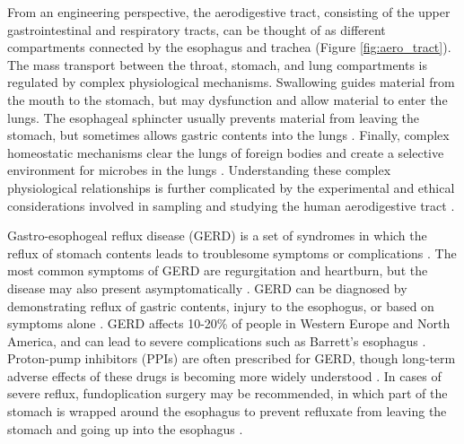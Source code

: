 \documentclass[12pt]{article}
\begin{document}
From an engineering perspective, the aerodigestive tract,
consisting of the upper gastrointestinal and respiratory tracts,
can be thought of as different compartments connected by the esophagus and trachea (Figure \ref{fig:aero_tract}).
The mass transport between the throat, stomach, and lung compartments is regulated by complex physiological 
mechanisms. Swallowing guides material from the mouth to the stomach, 
but may dysfunction and allow material to enter the lungs. The 
esophageal sphincter usually prevents material from leaving the 
stomach, but sometimes allows gastric contents into the lungs \cite{beck-lung-2012}. Finally, complex 
homeostatic mechanisms clear the lungs of foreign bodies and create a 
selective environment for microbes in the lungs \cite{martinharris-mbs-2008, dickson-lung_microbiome-2014}. 
Understanding these complex physiological relationships is further complicated
by the experimental and ethical considerations involved in
sampling and studying the human aerodigestive tract \cite{beck-lung-2012}.

Gastro-esophogeal reflux disease (GERD) is a set of syndromes in which 
the reflux of stomach contents leads to troublesome symptoms or 
complications \cite{vakil-gerd_defn-2006, dent-gerd_epi-2005}. The most common symptoms of GERD 
are regurgitation and heartburn, but the disease may also present 
asymptomatically \cite{vakil-gerd_defn-2006, dent-gerd_epi-2005}. 
GERD can be diagnosed by demonstrating reflux of gastric contents, injury to the esophogus, 
or based on symptoms alone \cite{vakil-gerd_defn-2006}. GERD affects
10-20\% of people in Western Europe and North America, and can lead to severe complications such as Barrett's 
esophagus \cite{vakil-gerd_defn-2006}. Proton-pump inhibitors (PPIs) are often prescribed for GERD,
though long-term adverse effects of these drugs is becoming more widely understood \cite{sweet-gerd_asp-2009, imhann-ppi-2016, houghton-microaspiration-2016}.
In cases of severe reflux, fundoplication surgery may
be recommended, in which part of the stomach is wrapped around the 
esophagus to prevent refluxate from leaving the stomach and going up
into the esophagus \cite{sweet-gerd_asp-2009}. 
\end{document}
